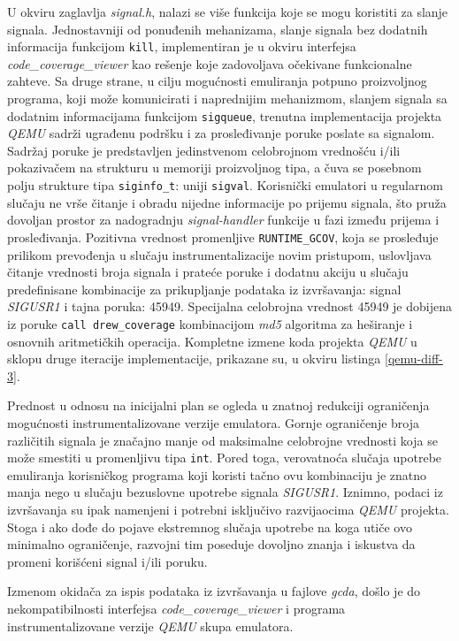 \documentclass[12pt,oneside]{memoir}
\newcommand{\kod}[1]{\texttt{#1}}
\newcommand{\strano}[1]{\textit{#1}}
\begin{document}
U okviru zaglavlja \strano{signal.h}, nalazi se više funkcija koje se mogu koristiti za slanje signala. Jednostavniji od ponuđenih mehanizama, slanje signala bez dodatnih informacija funkcijom \kod{kill}, implementiran je u okviru interfejsa \strano{code\_coverage\_viewer} kao rešenje koje zadovoljava očekivane funkcionalne zahteve. Sa druge strane, u cilju mogućnosti emuliranja potpuno proizvoljnog programa, koji može komunicirati i naprednijim mehanizmom, slanjem signala sa dodatnim informacijama funkcijom \kod{sigqueue}, trenutna implementacija projekta \strano{QEMU} sadrži ugrađenu podršku i za prosleđivanje poruke poslate sa signalom. Sadržaj poruke je predstavljen jedinstvenom celobrojnom vrednošću i/ili pokazivačem na strukturu u memoriji proizvoljnog tipa, a čuva se posebnom polju strukture tipa \kod{siginfo\_t}: uniji \kod{sigval}. Korisnički emulatori u regularnom slučaju ne vrše čitanje i obradu nijedne informacije po prijemu signala, što pruža dovoljan prostor za nadogradnju \strano{signal-handler} funkcije u fazi između prijema i prosleđivanja. Pozitivna vrednost promenljive \kod{RUNTIME\_GCOV}, koja se prosleđuje prilikom prevođenja u slučaju instrumentalizacije novim pristupom, uslovljava čitanje vrednosti broja signala i prateće poruke i dodatnu akciju u slučaju predefinisane kombinacije za prikupljanje podataka iz izvršavanja: signal \strano{SIGUSR1} i tajna poruka: 45949. Specijalna celobrojna vrednost 45949 je dobijena iz poruke \kod{call drew\_coverage} kombinacijom \strano{md5} algoritma za heširanje i osnovnih aritmetičkih operacija. Kompletne izmene koda projekta \strano{QEMU} u sklopu druge iteracije implementacije, prikazane su, u okviru listinga \ref{qemu-diff-3}.

Prednost u odnosu na inicijalni plan se ogleda u znatnoj redukciji ograničenja mogućnosti instrumentalizovane verzije emulatora. Gornje ograničenje broja različitih signala je značajno manje od maksimalne celobrojne vrednosti koja se može smestiti u promenljivu tipa \kod{int}. Pored toga, verovatnoća slučaja upotrebe emuliranja korisničkog programa koji koristi tačno ovu kombinaciju je znatno manja nego u slučaju bezuslovne upotrebe signala \strano{SIGUSR1}. Iznimno, podaci iz izvršavanja su ipak namenjeni i potrebni isključivo razvijaocima \strano{QEMU} projekta. Stoga i ako dođe do pojave ekstremnog slučaja upotrebe na koga utiče ovo minimalno ograničenje, razvojni tim poseduje dovoljno znanja i iskustva da promeni korišćeni signal i/ili poruku. 

Izmenom okidača za ispis podataka iz izvršavanja u fajlove \strano{gcda}, došlo je do nekompatibilnosti interfejsa \strano{code\_coverage\_viewer} i programa instrumentalizovane verzije \strano{QEMU} skupa emulatora. \\
\end{document}
